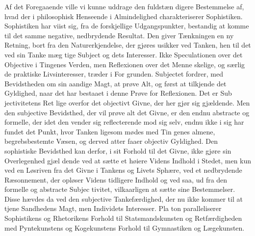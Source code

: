 \documentclass[12pt,a4paper]{book}
\begin{document}
Af det Foregaaende ville vi kunne uddrage den fuldstæn\-%
digere Bestemmelse af, hvad der i philosophisk Henseende i
Almindelighed charakteriserer Sophistiken. Sophistiken har
viist sig, fra de forskjellige Udgangspunkter, bestandig at
komme til det samme negative, nedbrydende Resultat. Den
giver Tænkningen en ny Retning, bort fra den Naturerkjendelse,
\setcounter{footnote}{0}
der gjøres usikker ved Tanken, hen til det ved sin Tanke mæg\-%
tige Subject og dets Interesser. Ikke Speculationen over det
Objective i Tingenes Verden, men Reflexionen over det Menne\-%
skelige, og særlig de praktiske Livsinteresser, træder i For\-%
grunden. Subjectet fordrer, med Bevidstheden om sin aandige
Magt, at prøve Alt, og først at tilkjende det Gyldighed, naar
det har bestaaet i denne Prøve for Reflexionen. Det er Sub\-%
jectivitetens Ret lige overfor det objectivt Givne, der her gjør
sig gjældende. Men den subjective Bevidsthed, der vil prøve
alt det Givne, er den endnu abstracte og formelle, der idet
den vender sig reflecterende mod sig selv, endnu ikke i sig
har fundet det Punkt, hvor Tanken ligesom mødes med Tin\-%
genes almene, begrebsbestemte Væsen, og derved atter faaer
objectiv Gyldighed. Den sophistiske Bevidsthed kan derfor, i
sit Forhold til det Givne, ikke gjøre sin Overlegenhed gjæl\-%
dende ved at sætte et høiere Videns Indhold i Stedet, men
kun ved en Løsriven fra det Givne i Tankens og Livets Sphære,
ved et nedbrydende Ræsonnement, der opløser Videns tidligere
Indhold og ved saa, ud fra den formelle og abstracte Subjec\-%
tivitet, vilkaarligen at sætte sine Bestemmelser. Disse hævdes
da ved den subjective Tankefærdighed, der nu ikke kommer
til at tjene Sandhedens Magt, men Individets Interesser. Pla\-%
ton paralleliserer Sophistikens og Rhetorikens Forhold til
Statsmandskunsten og Retfærdigheden med Pyntekunstens og
Kogekunstens Forhold til Gymnastiken og Lægekunsten.
\end{document}
